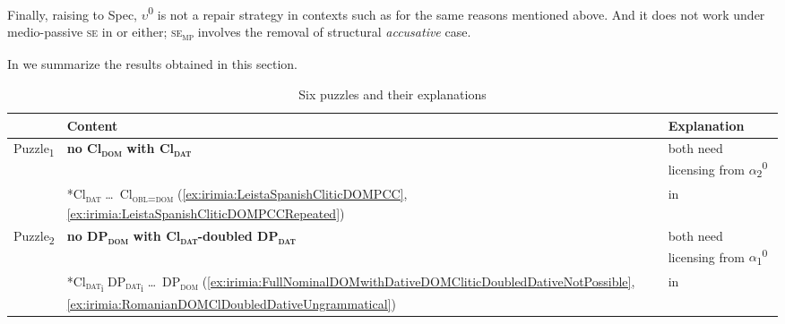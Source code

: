 \documentclass[output=paper,colorlinks,citecolor=brown,draft,draftmode]{langscibook}
\begin{document}
\newpage
Finally, raising to Spec, $\upsilon$\textsuperscript{0} is not a repair strategy in contexts such as  for the same reasons mentioned above. And it does not work under medio-passive \textsc{se} in  or  either; \textsc{se}\textsubscript{\textsc{mp}} involves the removal of structural \textit{accusative}
case. 

In  we summarize the results obtained in this section.

\begin{table}
\caption{Six puzzles and their explanations}
\label{tab:2:Summary2FivePuzzlesExplanation} %
\small
 \begin{tabularx}{\textwidth}{lQQ} %
  \lsptoprule
            & Content & Explanation  \\%
  \midrule
  Puzzle\textsubscript{1} & \textbf{no Cl\textsubscript{\textsc{dom}} with Cl\textsubscript{\textsc{dat}}} &   both need licensing from $\alpha$\textsubscript{2}\textsuperscript{0} \\
  & *Cl\textsubscript{\textsc{dat}}  \ldots\, Cl\textsubscript{\textsc{obl=dom}} (\ref{ex:irimia:LeistaSpanishCliticDOMPCC}, \ref{ex:irimia:LeistaSpanishCliticDOMPCCRepeated}) &  in \\
  \tablevspace
  Puzzle\textsubscript{2}  & \textbf{no DP\textsubscript{\textsc{dom}} with Cl\textsubscript{\textsc{dat}}-doubled DP\textsubscript{\textsc{dat}}}   &  both need licensing from $\alpha$\textsubscript{1}\textsuperscript{0}    \\
  & *Cl\textsubscript{\textsc{dat}\textsubscript{i}} DP\textsubscript{\textsc{dat}\textsubscript{i}} \ldots\, DP\textsubscript{\textsc{dom}}
(\ref{ex:irimia:FullNominalDOMwithDativeDOMCliticDoubledDativeNotPossible}, \ref{ex:irimia:RomanianDOMClDoubledDativeUngrammatical}) &   in  \\

\end{tabularx}
\end{table}
\end{document}
